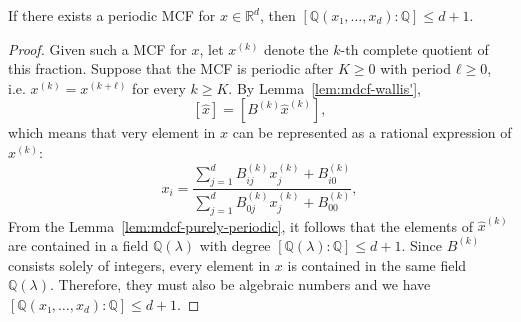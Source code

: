 \begin{theorem}
  \label{thm:mdcf-periodic}
  If there exists a periodic MCF for $x ∈ ℝ^d$,
  then $[ℚ(x₁, …, x_d) : ℚ] ≤ d + 1$.
\end{theorem}

\begin{proof}
  Given such a MCF for $x$, let $x^{(k)}$ denote the $k$-th complete quotient
  of this fraction.
  Suppose that the MCF is periodic after $K ≥ 0$ with period $ℓ ≥ 0$, i.e.
  $x^{(k)} = x^{(k+ℓ)}$ for every $k ≥ K$.
  By Lemma~\ref{lem:mdcf-wallis'},
  \[
    [\hat x] = [B^{(k)} \hat x^{(k)}],
  \]
  which means that very element in $x$ can be represented
  as a rational expression of $x^{(k)}$:
  \[
    x_i = \frac{∑_{j=1}^d B_{ij}^{(k)} x_j^{(k)} + B_{i0}^{(k)}}{\sum_{j=1}^d B_{0j}^{(k)} x_j^{(k)} + B_{00}^{(k)}},
  \]
  From the Lemma~\ref{lem:mdcf-purely-periodic},
  it follows that the elements of $\hat x^{(k)}$
  are contained in a field $ℚ(λ)$ with degree $[ℚ(λ) : ℚ] ≤ d+1$.
  Since $B^{(k)}$ consists solely of integers, every element in $x$ is contained in the same field $ℚ(λ)$.
  Therefore, they must also be algebraic numbers
  and we have $[ℚ(x₁, …, x_d) : ℚ] ≤ d+1$.
\end{proof}

